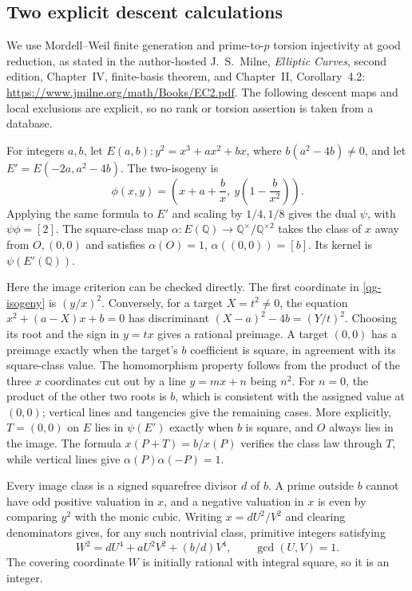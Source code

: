 \subsection{Two explicit descent calculations}
We use Mordell--Weil finite generation and prime-to-$p$ torsion injectivity
at good reduction, as stated in the author-hosted J.~S.~Milne,
\emph{Elliptic Curves}, second edition, Chapter~IV, finite-basis theorem,
and Chapter~II, Corollary~4.2:
\url{https://www.jmilne.org/math/Books/EC2.pdf}.
The following descent maps and local exclusions are explicit, so no rank
or torsion assertion is taken from a database.

For integers $a,b$, let $E(a,b):y^2=x^3+ax^2+bx$, where
$b(a^2-4b)\ne0$, and let
$E'=E(-2a,a^2-4b)$. The two-isogeny is
\begin{equation}\label{qg-isogeny}
 \phi(x,y)=\left(x+a+\frac bx,\ y\left(1-\frac b{x^2}\right)\right).
\end{equation}
Applying the same formula to $E'$ and scaling by $1/4,1/8$ gives the dual
$\psi$, with $\psi\phi=[2]$. The square-class map
$\alpha:E(\mathbb Q)\to\mathbb Q^\times/\mathbb Q^{\times2}$ takes
the class of $x$ away from $O,(0,0)$ and satisfies
$\alpha(O)=1$, $\alpha((0,0))=[b]$. Its kernel is $\psi(E'(\mathbb Q))$.

Here the image criterion can be checked directly. The first coordinate in
\eqref{qg-isogeny} is $(y/x)^2$. Conversely, for a target $X=t^2\ne0$, the
equation $x^2+(a-X)x+b=0$ has discriminant
$(X-a)^2-4b=(Y/t)^2$. Choosing its root and the sign in $y=tx$ gives a
rational preimage. A target $(0,0)$ has a preimage exactly when the target's
$b$ coefficient is square, in agreement with its square-class value.
The homomorphism property follows from the product of the three $x$
coordinates cut out by a line $y=mx+n$ being $n^2$. For $n=0$, the product
of the other two roots is $b$, which is consistent with the assigned
value at $(0,0)$; vertical lines and tangencies give the remaining cases.
More explicitly, $T=(0,0)$ on $E$ lies in $\psi(E')$ exactly when $b$ is
square, and $O$ always lies in the image. The formula
$x(P+T)=b/x(P)$ verifies the class law through $T$, while vertical lines
give $\alpha(P)\alpha(-P)=1$.

Every image class is a signed squarefree divisor $d$ of $b$. A prime
outside $b$ cannot have odd positive valuation in $x$, and a negative
valuation in $x$ is even by comparing $y^2$ with the monic cubic.
Writing $x=dU^2/V^2$ and clearing denominators gives, for any such
nontrivial class, primitive integers satisfying
\begin{equation}\label{qg-covering-quartic}
 W^2=dU^4+aU^2V^2+(b/d)V^4,\qquad \gcd(U,V)=1.
\end{equation}
The covering coordinate $W$ is initially rational with integral square,
so it is an integer.

